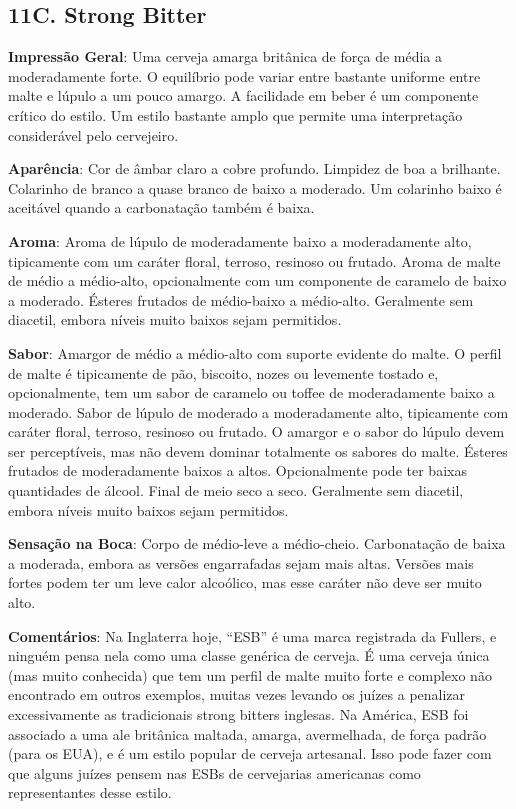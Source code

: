 \subsection*{11C. Strong Bitter}

\textbf{Impressão Geral}: Uma cerveja amarga britânica de força de média a moderadamente forte. O equilíbrio pode variar entre bastante uniforme entre malte e lúpulo a um pouco amargo. A facilidade em beber é um componente crítico do estilo. Um estilo bastante amplo que permite uma interpretação considerável pelo cervejeiro.

\textbf{Aparência}: Cor de âmbar claro a cobre profundo. Limpidez de boa a brilhante. Colarinho de branco a quase branco de baixo a moderado. Um colarinho baixo é aceitável quando a carbonatação também é baixa.

\textbf{Aroma}: Aroma de lúpulo de moderadamente baixo a moderadamente alto, tipicamente com um caráter floral, terroso, resinoso ou frutado. Aroma de malte de médio a médio-alto, opcionalmente com um componente de caramelo de baixo a moderado. Ésteres frutados de médio-baixo a médio-alto. Geralmente sem diacetil, embora níveis muito baixos sejam permitidos.

\textbf{Sabor}: Amargor de médio a médio-alto com suporte evidente do malte. O perfil de malte é tipicamente de pão, biscoito, nozes ou levemente tostado e, opcionalmente, tem um sabor de caramelo ou toffee de moderadamente baixo a moderado. Sabor de lúpulo de moderado a moderadamente alto, tipicamente com caráter floral, terroso, resinoso ou frutado. O amargor e o sabor do lúpulo devem ser perceptíveis, mas não devem dominar totalmente os sabores do malte. Ésteres frutados de moderadamente baixos a altos. Opcionalmente pode ter baixas quantidades de álcool. Final de meio seco a seco. Geralmente sem diacetil, embora níveis muito baixos sejam permitidos.

\textbf{Sensação na Boca}: Corpo de médio-leve a médio-cheio. Carbonatação de baixa a moderada, embora as versões engarrafadas sejam mais altas. Versões mais fortes podem ter um leve calor alcoólico, mas esse caráter não deve ser muito alto.

\textbf{Comentários}: Na Inglaterra hoje, “ESB” é uma marca registrada da Fullers, e ninguém pensa nela como uma classe genérica de cerveja. É uma cerveja única (mas muito conhecida) que tem um perfil de malte muito forte e complexo não encontrado em outros exemplos, muitas vezes levando os juízes a penalizar excessivamente as tradicionais strong bitters inglesas. Na América, ESB foi associado a uma ale britânica maltada, amarga, avermelhada, de força padrão (para os EUA), e é um estilo popular de cerveja artesanal. Isso pode fazer com que alguns juízes pensem nas ESBs de cervejarias americanas como representantes desse estilo.

